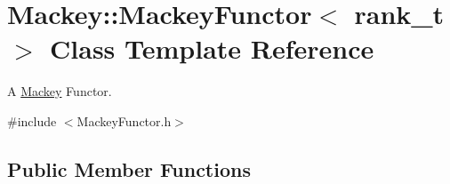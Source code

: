\hypertarget{classMackey_1_1MackeyFunctor}{}\section{Mackey\+:\+:Mackey\+Functor$<$ rank\+\_\+t $>$ Class Template Reference}
\label{classMackey_1_1MackeyFunctor}


A \hyperlink{namespaceMackey}{Mackey} Functor.  




{\ttfamily \#include $<$Mackey\+Functor.\+h$>$}

\subsection*{Public Member Functions}
